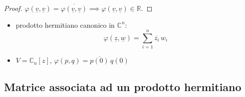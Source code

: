 \begin{proof}
    $\varphi(\underline{v}, \underline{v}) = \overline{\varphi(\underline{v}, \underline{v})} \implies \varphi(\underline{v}, \underline{v}) \in \mathbb{R}$.
\end{proof}
\begin{example} \hspace{1cm}
\begin{itemize}
    \item prodotto hermitiano canonico in $\mathbb{C}^n$:
    \[
        \varphi(\underline{z}, \underline{w})
        =
        \sum_{i=1}^n \overline{z_i}\, w_i
    \]

    \item $V = \mathbb{C}_n[z]$, $\varphi(p,q) = \overline{p(0)}\,q(0)$
\end{itemize}
\end{example}


\subsection{Matrice associata ad un prodotto hermitiano}

